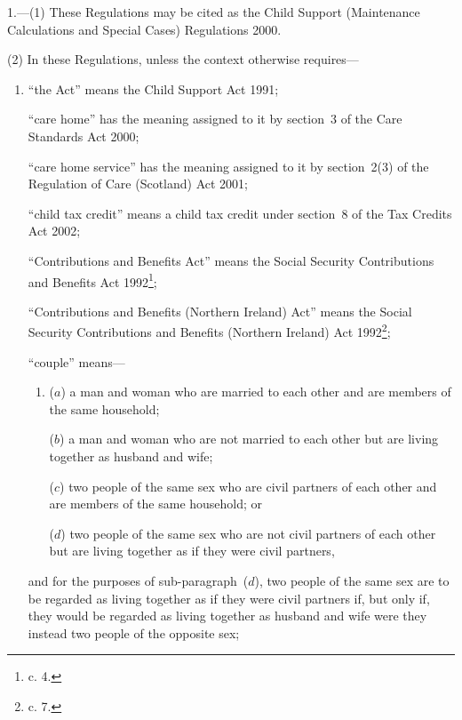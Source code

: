 \documentclass[12pt,a4paper]{article}
\begin{document}
1.---(1)  These Regulations may be cited as the Child Support (Maintenance Calculations and Special Cases) Regulations 2000.

(2) In these Regulations, unless the context otherwise requires—
\begin{enumerate}\item[]
“the Act” means the Child Support Act 1991;

“care home” has the meaning assigned to it by section~3 of the Care Standards Act 2000;

“care home service” has the meaning assigned to it by section~2(3) of the Regulation of Care (Scotland) Act 2001;

“child tax credit” means a child tax credit under section~8 of the Tax Credits Act 2002;

“Contributions and Benefits Act” means the Social Security Contributions and Benefits Act 1992\footnote{ c. 4.};

“Contributions and Benefits (Northern Ireland) Act” means the Social Security Contributions and Benefits (Northern Ireland) Act 1992\footnote{ c. 7.};

%

“couple” means—
\begin{enumerate}\item[]
($a$) 
a man and woman who are married to each other and are members of the same household;

($b$) 
a man and woman who are not married to each other but are living together as husband and wife;

($c$) 
two people of the same sex who are civil partners of each other and are members of the same household; or

($d$) 
two people of the same sex who are not civil partners of each other but are living together as if they were civil partners,
\end{enumerate}
and for the purposes of sub-paragraph~($d$), two people of the same sex are to be regarded as living together as if they were civil partners if, but only if, they would be regarded as living together as husband and wife were they instead two people of the opposite sex;


\end{enumerate}
\end{document}

